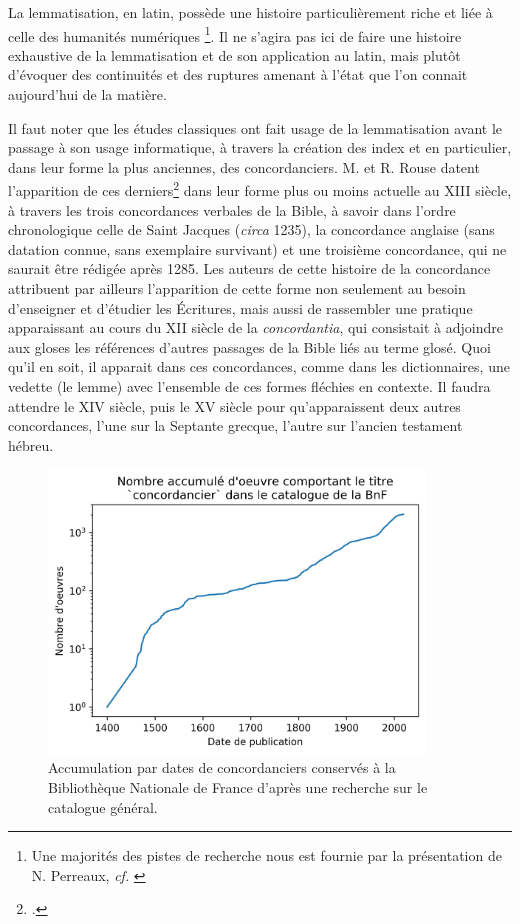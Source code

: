 La lemmatisation, en latin, possède une histoire particulièrement riche et liée à celle des humanités numériques \footnote{Une majorités des pistes de recherche nous est fournie par la présentation de N. Perreaux, \textit{cf.} \cite{perreaux_lemmatisation_2019}}. Il ne s'agira pas ici de faire une histoire exhaustive de la lemmatisation et de son application au latin, mais plutôt d'évoquer des continuités et des ruptures amenant à l'état que l'on connait aujourd'hui de la matière.

Il faut noter que les études classiques ont fait usage de la lemmatisation avant le passage à son usage informatique, à travers la création des index et en particulier, dans leur forme la plus anciennes, des concordanciers. M. et R. Rouse datent l'apparition de ces derniers\footcite{rouse_concordance_1984} dans leur forme plus ou moins actuelle au XIII siècle, à travers les trois concordances verbales de la Bible, à savoir dans l'ordre chronologique celle de Saint Jacques (\textit{circa} 1235), la concordance anglaise (sans datation connue, sans exemplaire survivant) et une troisième concordance, qui ne saurait être rédigée après 1285. Les auteurs de cette histoire de la concordance attribuent par ailleurs l'apparition de cette forme non seulement au besoin d'enseigner et d'étudier les Écritures, mais aussi de rassembler une pratique apparaissant au cours du XII siècle de la \textit{concordantia}, qui consistait à adjoindre aux gloses les références d'autres passages de la Bible liés au terme glosé. Quoi qu'il en soit, il apparait dans ces concordances, comme dans les dictionnaires, une vedette (le lemme) avec l'ensemble de ces formes fléchies en contexte. Il faudra attendre le XIV siècle, puis le XV siècle pour qu'apparaissent deux autres concordances, l'une sur la Septante grecque, l'autre sur l'ancien testament hébreu.

\begin{figure}[h]
    \centering
    \includegraphics[width=10cm]{results/lemmatisation/histoire/concordanciers.png}
    \caption{Accumulation par dates de concordanciers conservés à la Bibliothèque Nationale de France d'après une recherche sur le catalogue général.}
    \label{lemmatisation:concordanciers}
\end{figure}

